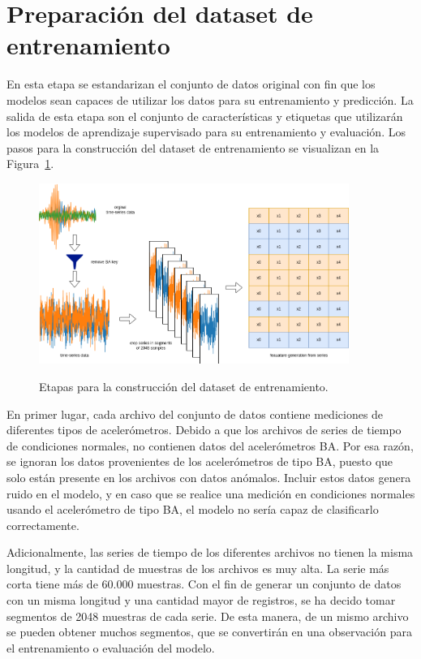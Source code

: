 \documentclass[11pt,a4paper,spanish]{book}
\numberwithin{equation}{chapter}
\numberwithin{figure}{chapter}
\begin{document}
\section{Preparación del dataset de entrenamiento}

En esta etapa se estandarizan el conjunto de datos original con fin que los modelos sean 
capaces de utilizar los datos para su entrenamiento y predicción. La salida de esta etapa
son el conjunto de características y etiquetas que utilizarán los modelos de aprendizaje 
supervisado para su entrenamiento y evaluación. Los pasos para la construcción del dataset 
de entrenamiento se visualizan en la Figura~\ref{fig:figGenerationDataset}.


\begin{figure}[h]
    \caption{Etapas para la construcción del dataset de entrenamiento.}
    \centering
    \includegraphics[width=0.9\textwidth]{media/generacion-dataset.drawio.png}
    \label{fig:figGenerationDataset}
\end{figure}


En primer lugar, cada archivo del conjunto de datos contiene mediciones de diferentes 
tipos de acelerómetros. Debido a que los archivos de series de tiempo de condiciones 
normales, no contienen datos del acelerómetros BA. Por esa razón, se ignoran los datos 
provenientes de los acelerómetros de tipo BA, puesto que solo están presente en los 
archivos con datos anómalos. Incluir estos datos genera ruido en el modelo, y en caso 
que se realice una medición en condiciones normales usando el acelerómetro de tipo BA, 
el modelo no sería capaz de clasificarlo correctamente.


Adicionalmente, las series de tiempo de los diferentes archivos no tienen la misma 
longitud, y la cantidad de muestras de los archivos es muy alta. La serie más corta 
tiene más de 60.000 muestras. Con el fin de generar un conjunto de datos con un misma 
longitud y una cantidad mayor de registros, se ha decido tomar segmentos de 2048 
muestras de cada serie.  De esta manera, de un mismo archivo se pueden obtener muchos 
segmentos, que se convertirán en una observación para el entrenamiento o evaluación 
del modelo. 
\end{document}
